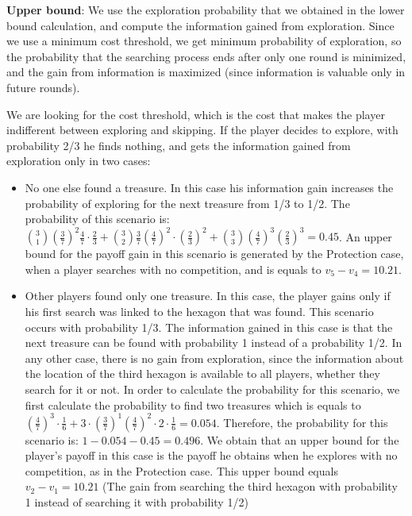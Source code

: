 \textbf{Upper bound}:
We use the exploration probability that we obtained in the lower bound calculation, and compute the information gained from exploration. Since we use a minimum cost threshold, we get minimum probability of exploration, so the probability that the searching process ends after only one round is minimized, and the gain from information is maximized (since information is valuable only in future rounds). 

We are looking for the cost threshold, which is the cost that makes the player indifferent between exploring and skipping. If the player decides to explore, with probability 2/3 he finds nothing, and gets the information gained from exploration only in two cases:\\
\begin{itemize}
    \item No one else found a treasure. In this case his information gain increases the probability of exploring for the next treasure from 1/3 to 1/2. The probability of this scenario is:$\binom{3}{1}(\frac{3}{7})^2\frac{4}{7}\cdot\frac{2}{3}+\binom{3}{2}\frac{3}{7}(\frac{4}{7})^2\cdot(\frac{2}{3})^2+\binom{3}{3}(\frac{4}{7})^3(\frac{2}{3})^3=0.45$. An upper bound for the payoff gain in this scenario is generated by the Protection case, when a player searches with no competition, and is equals to $v_5-v_4=10.21$. 
    \item Other players found only one treasure. In this case, the player gains only if his first search was linked to the hexagon that was found. This scenario occurs with probability 1/3. The information gained in this case is that the next treasure can be found with probability 1 instead of a probability 1/2. 
    In any other case, there is no gain from exploration, since the information about the location of the third hexagon is available to all players, whether they search for it or not. In order to calculate the probability for this scenario, we first calculate the probability to find two treasures which is equals to $(\frac{4}{7})^3\cdot\frac{1}{6}+3\cdot(\frac{3}{7})^1(\frac{4}{7})^2\cdot2\cdot\frac{1}{6}=0.054$. Therefore, the probability for this scenario is: $1-0.054-0.45=0.496$. We obtain that an upper bound for the player's payoff in this case is the payoff he obtains when he explores with no competition, as in the Protection case. This upper bound equals $v_2-v_1=10.21$ (The gain from searching the third hexagon with probability 1 instead of searching it with probability 1/2)  \\
\end{itemize} 

